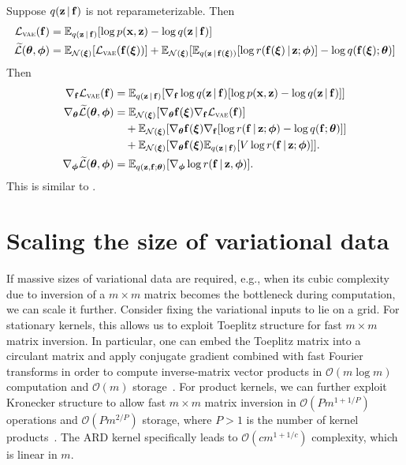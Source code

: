 \PP
Suppose $q(\mbz\g\f)$ is not reparameterizable.  Then
\begin{align*}
\cL_{\textsc{vae}}(\f)
&=
\mathbb{E}_{q(\mbz\g\f)}[\log p(\mbx,\mbz) - \log q(\mbz\g\f)]
\\
\widetilde{\cL}(\mbtheta, \mbphi)
&=
\mathbb{E}_{\mathcal{N}(\mbxi)}[\cL_{\textsc{vae}}(\f(\mbxi))]
+
\mathbb{E}_{\mathcal{N}(\mbxi)}[\mathbb{E}_{q(\mbz\g\f(\mbxi))}[\log r(\f(\mbxi) \g \mbz ; \mbphi)] - \log q(\f(\mbxi) ; \mbtheta)]
\\
\end{align*}
Then
\begin{align*}
\nabla_{\f}
\cL_{\textsc{vae}}(\f)
&=
\mathbb{E}_{q(\mbz\g\f)}[\nabla_{\f} \log q(\mbz\g\f) [\log p(\mbx,\mbz) - \log q(\mbz\g\f)]]
\\
\nabla_{\mbtheta}
\widetilde{\cL}(\mbtheta, \mbphi)
&=
\mathbb{E}_{\mathcal{N}(\mbxi)}[\nabla_{\mbtheta} \f(\mbxi) \nabla_{\f} \cL_{\textsc{vae}}(\f)]
\\
&\quad
+
\mathbb{E}_{\mathcal{N}(\mbxi)}[\nabla_{\mbtheta} \f(\mbxi) \nabla_{\f} [\log r(\f \g \mbz ; \mbphi) - \log q(\f ; \mbtheta)]]
\\
&\quad +
\mathbb{E}_{\mathcal{N}(\mbxi)}[\nabla_{\mbtheta} \f(\mbxi) \mathbb{E}_{q(\mbz \g \f)}[V \log r(\f \g \mbz ; \mbphi)]].
\\
\nabla_{\mbphi}
\widetilde{\cL}(\mbtheta, \mbphi)
&=
\mathbb{E}_{q(\mbz,\f;\mbtheta)} [\nabla_{\mbphi} \log r(\f \g \mbz, \mbphi)]
.
\end{align*}
This is similar to \citet{ranganath2015hierarchical}.
\fi

\section{Scaling the size of variational data}
\label{appendix:size}

If massive sizes of variational data are required, e.g., when its
cubic complexity due to inversion of a $m\times m$ matrix becomes the
bottleneck during computation, we can scale it further.
Consider fixing the variational inputs to lie on a grid.
For stationary kernels, this allows us to exploit Toeplitz structure
for fast $m\times m$ matrix inversion. In particular, one can embed
the Toeplitz matrix into a circulant matrix and apply conjugate
gradient combined with fast Fourier transforms in order to compute
inverse-matrix vector products in $\mathcal{O}(m\log m)$ computation
and $\mathcal{O}(m)$ storage~\citep{cunningham2008fast}.
For product kernels, we can further exploit Kronecker structure to
allow fast $m\times m$ matrix inversion in $\mathcal{O}(Pm^{1+1/P})$
operations and $\mathcal{O}(Pm^{2/P})$ storage, where $P>1$ is the
number of kernel products~\citep{osborne2010bayesian}. The \gls{ARD}
kernel specifically leads to $\mathcal{O}(cm^{1+1/c})$ complexity,
which is linear in $m$.

